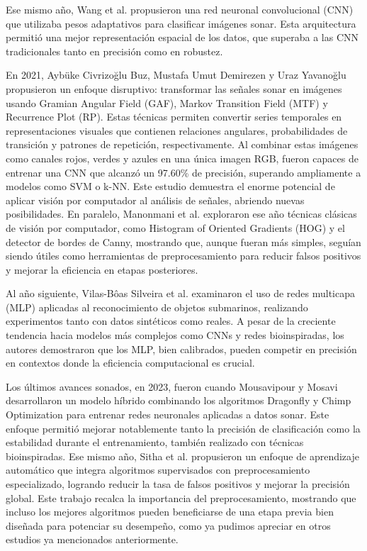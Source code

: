 \documentclass[a4paper,10pt]{article}
\begin{document}
Ese mismo año, Wang et al. propusieron una red neuronal convolucional (CNN) que utilizaba pesos adaptativos para clasificar imágenes sonar. Esta arquitectura permitió una mejor representación espacial de los datos, que superaba a las CNN tradicionales tanto en precisión como en robustez. \cite{wang2019}

En 2021, Aybüke Civrizoğlu Buz, Mustafa Umut Demirezen y Uraz Yavanoğlu propusieron un enfoque disruptivo: transformar las señales sonar en imágenes usando Gramian Angular Field (GAF), Markov Transition Field (MTF) y Recurrence Plot (RP). Estas técnicas permiten convertir series temporales en representaciones visuales que contienen relaciones angulares, probabilidades de transición y patrones de repetición, respectivamente. Al combinar estas imágenes como canales rojos, verdes y azules en una única imagen RGB, fueron capaces de entrenar una CNN que alcanzó un 97.60\% de precisión, superando ampliamente a modelos como SVM o k-NN. Este estudio demuestra el enorme potencial de aplicar visión por computador al análisis de señales, abriendo nuevas posibilidades.\cite{civrizoglu2021} En paralelo, Manonmani et al. exploraron ese año técnicas clásicas de visión por computador, como Histogram of Oriented Gradients (HOG) y el detector de bordes de Canny, mostrando que, aunque fueran más simples, seguían siendo útiles como herramientas de preprocesamiento para reducir falsos positivos y mejorar la eficiencia en etapas posteriores. \cite{manonmani2021}

Al año siguiente, Vilas-Bôas Silveira et al. examinaron el uso de redes multicapa (MLP) aplicadas al reconocimiento de objetos submarinos, realizando experimentos tanto con datos sintéticos como reales. A pesar de la creciente tendencia hacia modelos más complejos como CNNs y redes bioinspiradas, los autores demostraron que los MLP, bien calibrados, pueden competir en precisión en contextos donde la eficiencia computacional es crucial. \cite{vilas2022}

Los últimos avances sonados, en 2023, fueron cuando Mousavipour y Mosavi desarrollaron un modelo híbrido combinando los algoritmos Dragonfly y Chimp Optimization para entrenar redes neuronales aplicadas a datos sonar. Este enfoque permitió mejorar notablemente tanto la precisión de clasificación como la estabilidad durante el entrenamiento, también realizado con técnicas bioinspiradas.\cite{mousavipour2023} Ese mismo año, Sitha et al. propusieron un enfoque de aprendizaje automático que integra algoritmos supervisados con preprocesamiento especializado, logrando reducir la tasa de falsos positivos y mejorar la precisión global. Este trabajo recalca la importancia del preprocesamiento, mostrando que incluso los mejores algoritmos pueden beneficiarse de una etapa previa bien diseñada para potenciar su desempeño, como ya pudimos apreciar en otros estudios ya mencionados anteriormente. \cite{sitha2023}
\end{document}
